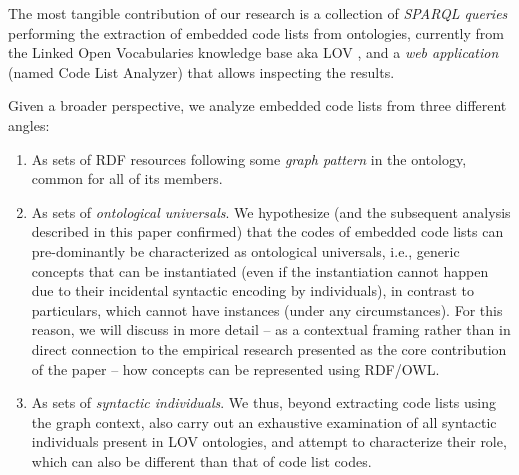 

The most tangible contribution of our research is a collection of \emph{SPARQL queries} performing the extraction of embedded code lists from ontologies, currently from the Linked Open Vocabularies knowledge base aka LOV \cite{DBLP:journals/semweb/VandenbusscheAP17}, and a \emph{web application} (named Code List Analyzer) that allows inspecting the results. 


Given a broader perspective, we analyze embedded code lists from three different angles:
\begin{enumerate}
    \item As sets of RDF resources following some \emph{graph pattern} in the ontology, common for all of its members.
    \item As sets of \emph{ontological universals}. We hypothesize (and the subsequent analysis described in this paper confirmed) that the codes of embedded code lists can pre-dominantly be characterized as ontological universals, i.e., generic concepts that can be instantiated (even if the instantiation cannot happen due to their incidental syntactic encoding by individuals), in contrast to particulars, which cannot have instances (under any circumstances). For this reason, we will discuss in more detail -- as a contextual framing rather than in direct connection to the empirical research presented as the core contribution of the paper -- how concepts can be represented using RDF/OWL.
    \item As sets of \emph{syntactic individuals}. We thus, beyond extracting code lists using the graph context, also carry out an exhaustive examination of all syntactic individuals present in LOV ontologies, and attempt to characterize their role, which can also be different than that of code list codes.
\end{enumerate}

